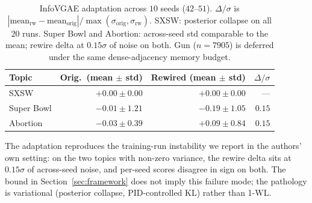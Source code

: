 \begin{table}[h]
\centering
\small
\begin{tabular}{lrrr}
\toprule
Topic & Orig.\ (mean $\pm$ std) & Rewired (mean $\pm$ std) & $\Delta/\sigma$ \\
\midrule
SXSW        & $+0.00 \pm 0.00$    & $+0.00 \pm 0.00$    & --- \\
Super Bowl  & $-0.01 \pm 1.21$    & $-0.19 \pm 1.05$    & $0.15$ \\
Abortion    & $-0.03 \pm 0.39$    & $+0.09 \pm 0.84$    & $0.15$ \\
\bottomrule
\end{tabular}
\caption{InfoVGAE adaptation across $10$ seeds ($42$--$51$).
$\Delta/\sigma$ is
$|\text{mean}_{\text{rw}} - \text{mean}_{\text{orig}}| /
\max(\sigma_{\text{orig}}, \sigma_{\text{rw}})$. SXSW:
posterior collapse on all $20$ runs. Super Bowl and Abortion:
across-seed std comparable to the mean; rewire delta at
$0.15\sigma$ of noise on both. Gun ($n = 7905$) is deferred
under the same dense-adjacency memory budget.}
\end{table}

The adaptation reproduces the training-run instability we
report in the authors' own setting: on the two topics with
non-zero variance, the rewire delta sits at $0.15\sigma$ of
across-seed noise, and per-seed scores disagree in sign on
both. The bound in Section~\ref{sec:framework}
does not imply this failure mode; the pathology is variational
(posterior collapse, PID-controlled KL) rather than 1-WL.
